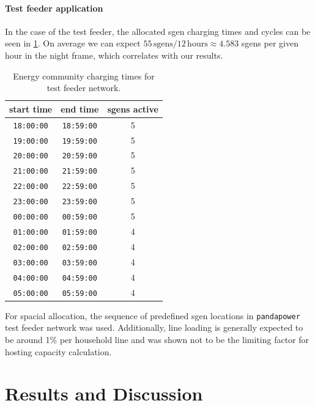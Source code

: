 \documentclass[a4paper,10pt]{report}
\begin{document}
\subsubsection{Test feeder application}
In the case of the test feeder, the allocated sgen charging times and cycles can be seen in \cref{sgen_comm_times}. On average we can expect $55\, \text{sgens} / 12\, \text{hours} \approx 4.583$ sgens per given hour in the night frame, which correlates with our results.

\begin{table}[htpb]
	\centering
	\begin{tabular}{c c c}
		\toprule
		start time & end time & sgens active \\
		\midrule
		\texttt{18:00:00} & \texttt{18:59:00} & 5\\
		\texttt{19:00:00} & \texttt{19:59:00} & 5\\
		\texttt{20:00:00} & \texttt{20:59:00} & 5\\
		\texttt{21:00:00} & \texttt{21:59:00} & 5\\
		\texttt{22:00:00} & \texttt{22:59:00} & 5\\
		\texttt{23:00:00} & \texttt{23:59:00} & 5\\
		\texttt{00:00:00} & \texttt{00:59:00} & 5\\
		\texttt{01:00:00} & \texttt{01:59:00} & 4\\
		\texttt{02:00:00} & \texttt{02:59:00} & 4\\
		\texttt{03:00:00} & \texttt{03:59:00} & 4\\
		\texttt{04:00:00} & \texttt{04:59:00} & 4\\
		\texttt{05:00:00} & \texttt{05:59:00} & 4\\
		\bottomrule
	\end{tabular}
	\caption[Energy community charging times for test feeder network]{Energy community charging times for test feeder network.}
	\label{sgen_comm_times}
\end{table}

For spacial allocation, the sequence of predefined sgen locations in \texttt{pandapower} test feeder network was used. Additionally, line loading is generally expected to be around 1\% per household line and was shown not to be the limiting factor for hosting capacity calculation.


\chapter{Results and Discussion}
\end{document}
